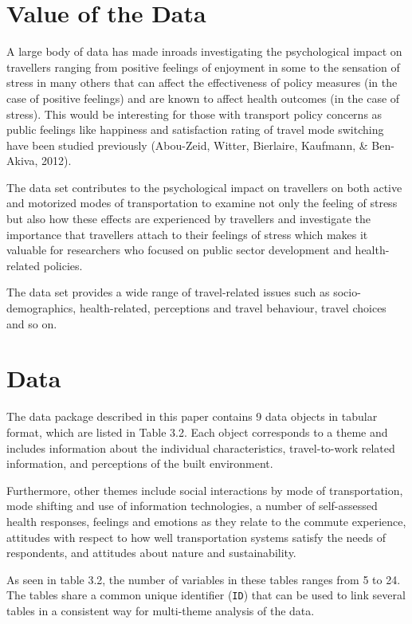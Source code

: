 \documentclass[
11pt, %
oneside, %
english, %
singlespacing, %
]{macthesis} %
\begin{document}
\hypertarget{value-of-the-data}{%
\section{Value of the Data}\label{value-of-the-data}}

A large body of data has made inroads investigating the psychological impact on travellers ranging from positive feelings of enjoyment in some to the sensation of stress in many others that can affect the effectiveness of policy measures (in the case of positive feelings) and are known to affect health outcomes (in the case of stress). This would be interesting for those with transport policy concerns as public feelings like happiness and satisfaction rating of travel mode switching have been studied previously (Abou-Zeid, Witter, Bierlaire, Kaufmann, \& Ben-Akiva, 2012).

The data set contributes to the psychological impact on travellers on both active and motorized modes of transportation to examine not only the feeling of stress but also how these effects are experienced by travellers and investigate the importance that travellers attach to their feelings of stress which makes it valuable for researchers who focused on public sector development and health-related policies.

The data set provides a wide range of travel-related issues such as socio-demographics, health-related, perceptions and travel behaviour, travel choices and so on.

\hypertarget{data}{%
\section{Data}\label{data}}

The data package described in this paper contains 9 data objects in tabular format, which are listed in Table 3.2. Each object corresponds to a theme and includes information about the individual characteristics, travel-to-work related information, and perceptions of the built environment.

Furthermore, other themes include social interactions by mode of transportation, mode shifting and use of information technologies, a number of self-assessed health responses, feelings and emotions as they relate to the commute experience, attitudes with respect to how well transportation systems satisfy the needs of respondents, and attitudes about nature and sustainability.

As seen in table 3.2, the number of variables in these tables ranges from 5 to 24. The tables share a common unique identifier (\texttt{ID}) that can be used to link several tables in a consistent way for multi-theme analysis of the data.
\end{document}
